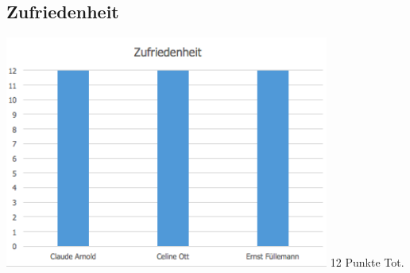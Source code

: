 \documentclass[a4,12pt]{scrartcl}
\begin{document}
\subsection{Zufriedenheit}
\includegraphics[width=0.8\textwidth]{./pictures/zufriedenheit.png}
12 Punkte Tot.
\end{document}
